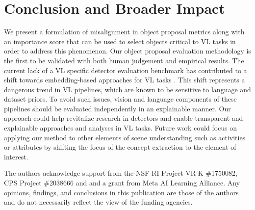 \documentclass[10pt,twocolumn,letterpaper]{article}
\begin{document}
\section{Conclusion and Broader Impact}
We present a formulation of misalignment in object proposal metrics along with an importance score that can be used to select objects critical to VL tasks in order to address this phenomenon. Our object proposal evaluation methodology is the first to be validated with both human judgement and empirical results. The current lack of a VL specific detector evaluation benchmark has contributed to a shift towards embedding-based approaches for VL tasks \cite{embedding2020,embedding2022}. This shift represents a dangerous trend in VL pipelines, which are known to be sensitive to language \cite{capbias2018} and dataset \cite{vqamatter2017} priors. To avoid such issues, vision and language components of these pipelines should be evaluated independently in an explainable manner. Our approach could help revitalize research in detectors and enable transparent and explainable approaches and analyses in VL tasks. Future work could focus on applying our method to other elements of scene understanding such as activities or attributes by shifting the focus of the concept extraction to the element of interest.

The authors acknowledge support from the NSF RI Project VR-K \#1750082, CPS Project \#2038666 and and a grant from Meta AI Learning Alliance. Any opinions, findings, and conclusions in this publication are those of the authors and do not necessarily reflect the view of the funding agencies. 


{\small


}
\end{document}
